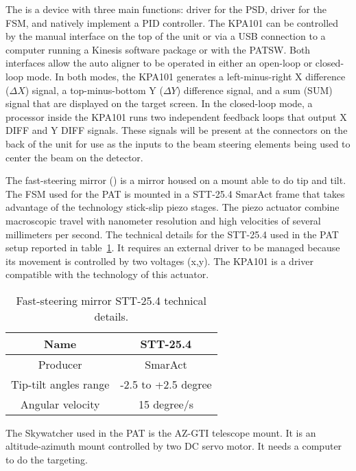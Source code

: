 The  is a device with three main functions: driver for the PSD, driver for the FSM, and natively implement a PID controller.
The KPA101 can be controlled by the manual interface on the top of the unit or via a USB connection to a computer running a Kinesis software package or with the PATSW. Both interfaces allow the auto aligner to be operated in either an open-loop or closed-loop mode. In both modes, the KPA101 generates a left-minus-right X difference ($\Delta X$) signal, a top-minus-bottom Y ($\Delta Y$) difference signal, and a sum (SUM) signal that are displayed on the target screen. In the closed-loop mode, a processor inside the KPA101 runs two independent feedback loops that output X DIFF and Y DIFF signals. These signals will be present at the connectors on the back of the unit for use as the inputs to the beam steering elements being used to center the beam on the detector.

The fast-steering mirror () is a mirror housed on a mount able to do tip and tilt.
The FSM used for the PAT is mounted in a STT-25.4 SmarAct frame that takes advantage of the technology stick-slip piezo stages. The piezo actuator combine macroscopic travel with nanometer resolution and high velocities of several millimeters per second. The technical details for the STT-25.4 used in the PAT setup reported in table~\ref{table:3}.
It requires an external driver to be managed because its movement is controlled by two voltages (x,y). The KPA101 is a driver compatible with the technology of this actuator.

\begin{table}[h!]
  \centering
  \begin{tabular}{ |c|c| }
    \hline
    Name                  & STT-25.4            \\\hline
    Producer              & SmarAct             \\\hline
    Tip-tilt angles range & -2.5 to +2.5 degree \\\hline
    Angular velocity      & 15 degree/s         \\\hline
  \end{tabular}
  \caption{Fast-steering mirror STT-25.4 technical details.}
  \label{table:3}
\end{table}

The Skywatcher used in the PAT is the AZ-GTI telescope mount. It is an altitude-azimuth mount controlled by two DC servo motor. It needs a computer to do the targeting.

